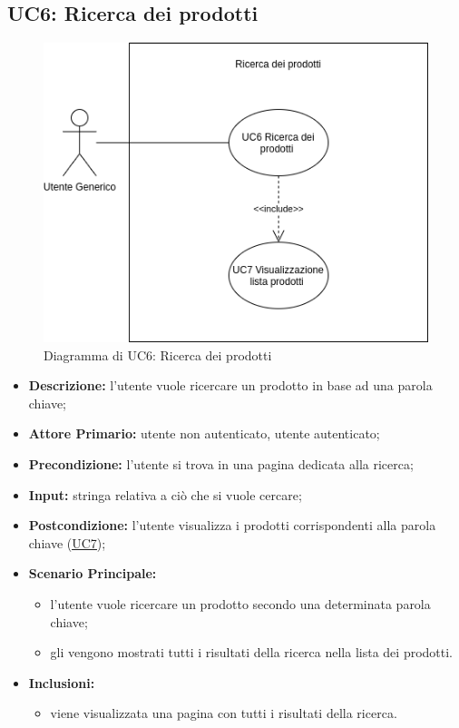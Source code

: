 \subsection{UC6: Ricerca dei prodotti}
\label{sec:UC6}
\begin{figure}[!ht]
    \caption{Diagramma di UC6: Ricerca dei prodotti}
    \vspace{10px}
    \includegraphics[scale=0.5]{../../../Images/AnalisiRequisiti/UC06}
    \centering
\end{figure}
\begin{itemize}
    \item \textbf{Descrizione:} l'utente vuole ricercare un prodotto in base ad una parola chiave;
    \item \textbf{Attore Primario:} utente non autenticato, utente autenticato;
    \item \textbf{Precondizione:} l'utente si trova in una pagina dedicata alla ricerca;
    \item \textbf{Input:} stringa relativa a ciò che si vuole cercare;
    \item \textbf{Postcondizione:} l'utente visualizza i prodotti corrispondenti alla parola chiave (\hyperref[sec:UC7]{\underline{UC7}});
    \item \textbf{Scenario Principale:}
          \begin{itemize}
              \item l'utente vuole ricercare un prodotto secondo una determinata parola chiave;
              \item gli vengono mostrati tutti i risultati della ricerca nella lista dei prodotti.
          \end{itemize}
    \item \textbf{Inclusioni:}
          \begin{itemize}
              \item viene visualizzata una pagina con tutti i risultati della ricerca.
          \end{itemize}
\end{itemize}
